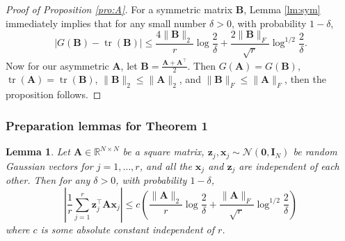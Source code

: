 \documentclass[10pt]{article}
\newcommand{\B}{\mathbf}
\newtheorem{lemma}[theorem]{Lemma}
\begin{document}
\begin{proof}[Proof of Proposition \ref{pro:A}]
For a symmetric matrix $\B{B}$, Lemma \ref{lm:sym} immediately implies that for any small number $\delta >0$, with probability $1-\delta$,
\[
| G(\B{B}) - \operatorname{tr}(\B{B})| \leq \frac{4\|\B{B}\|_2}{r}\log \frac{2}{\delta} + \frac{2\|\B{B}\|_F}{\sqrt r}\log^{1/2} \frac{2}{\delta}.
\]
Now for our asymmetric $\B{A}$, let $\B{B} = \frac{\B{A}+\B{A}^{\top}}{2}$. Then $G(\B{A}) = G(\B{B})$, $\operatorname{tr}(\B{A})=\operatorname{tr}(\B{B})$, $\|\B{B}\|_2 \leq \|\B{A}\|_2$, and $\|\B{B}\|_F\leq \|\B{A}\|_F$, then the proposition follows.
\end{proof}

\subsubsection{Preparation lemmas for Theorem 1}
\begin{lemma}\label{lm:off} Let $\B{A}\in \mathbb{R}^{N \times N}$ be a square matrix, $\B{z}_j, \B{x}_j\sim \mathcal{N}(\B{0},\B{I}_N)$ be random Gaussian vectors for $j=1,\ldots,r$, and all the $\B{x}_j$ and $\B{z}_j$ are independent of each other. Then for any $\delta > 0$, with probability $1-\delta$,
\[
\left|\frac{1}{r} \sum\limits_{j=1}^{r} \B{z}_j^{\top}\B{A}\B{x}_j \right| \leq c \left( \frac{\|\B{A}\|_2}{r}\log \frac{2}{\delta} + \frac{\|\B{A}\|_F}{\sqrt r}\log^{1/2} \frac{2}{\delta}\right)
\]
where $c$ is some absolute constant independent of $r$.
\end{lemma}
\end{document}
